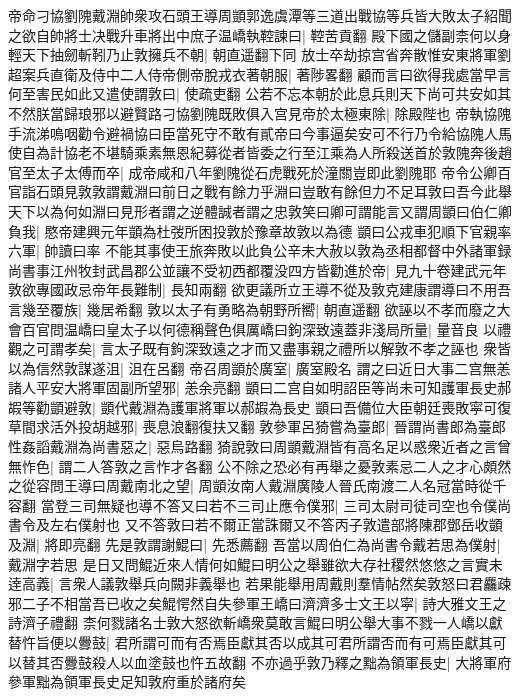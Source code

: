 帝命刁協劉隗戴淵帥衆攻石頭王導周顗郭逸虞潭等三道出戰協等兵皆大敗太子紹聞之欲自帥將士决戰升車將出中庶子温嶠執鞚諫曰|{
	鞚苦貢翻}
殿下國之儲副柰何以身輕天下抽劒斬靷乃止敦擁兵不朝|{
	朝直遥翻下同}
放士卒劫掠宫省奔散惟安東將軍劉超案兵直衛及侍中二人侍帝側帝脫戎衣著朝服|{
	著陟畧翻}
顧而言曰欲得我處當早言何至害民如此又遣使謂敦曰|{
	使疏吏翻}
公若不忘本朝於此息兵則天下尚可共安如其不然朕當歸琅邪以避賢路刁協劉隗既敗俱入宫見帝於太極東除|{
	除殿陛也}
帝執協隗手流涕嗚咽勸令避禍協曰臣當死守不敢有貳帝曰今事逼矣安可不行乃令給協隗人馬使自為計協老不堪騎乘素無恩紀募從者皆委之行至江乘為人所殺送首於敦隗奔後趙官至太子太傅而卒|{
	成帝咸和八年劉隗從石虎戰死於潼關豈即此劉隗耶}
帝令公卿百官詣石頭見敦敦謂戴淵曰前日之戰有餘力乎淵曰豈敢有餘但力不足耳敦曰吾今此舉天下以為何如淵曰見形者謂之逆體誠者謂之忠敦笑曰卿可謂能言又謂周顗曰伯仁卿負我|{
	愍帝建興元年顗為杜弢所困投敦於豫章故敦以為德}
顗曰公戎車犯順下官親率六軍|{
	帥讀曰率}
不能其事使王旅奔敗以此負公辛未大赦以敦為丞相都督中外諸軍録尚書事江州牧封武昌郡公並讓不受初西都覆没四方皆勸進於帝|{
	見九十卷建武元年}
敦欲專國政忌帝年長難制|{
	長知兩翻}
欲更議所立王導不從及敦克建康謂導曰不用吾言幾至覆族|{
	幾居希翻}
敦以太子有勇略為朝野所嚮|{
	朝直遥翻}
欲誣以不孝而廢之大會百官問温嶠曰皇太子以何德稱聲色俱厲嶠曰鉤深致遠蓋非淺局所量|{
	量音良}
以禮觀之可謂孝矣|{
	言太子既有鉤深致遠之才而又盡事親之禮所以解敦不孝之誣也}
衆皆以為信然敦謀遂沮|{
	沮在呂翻}
帝召周顗於廣室|{
	廣室殿名}
謂之曰近日大事二宫無恙諸人平安大將軍固副所望邪|{
	恙余亮翻}
顗曰二宫自如明詔臣等尚未可知護軍長史郝嘏等勸顗避敦|{
	顗代戴淵為護軍將軍以郝嘏為長史}
顗曰吾備位大臣朝廷喪敗寜可復草間求活外投胡越邪|{
	喪息浪翻復扶又翻}
敦參軍呂猗嘗為臺郎|{
	晉謂尚書郎為臺郎}
性姦謟戴淵為尚書惡之|{
	惡烏路翻}
猗說敦曰周顗戴淵皆有高名足以惑衆近者之言曾無怍色|{
	謂二人答敦之言怍才各翻}
公不除之恐必有再舉之憂敦素忌二人之才心頗然之從容問王導曰周戴南北之望|{
	周顗汝南人戴淵廣陵人晉氏南渡二人名冠當時從千容翻}
當登三司無疑也導不答又曰若不三司止應令僕邪|{
	三司太尉司徒司空也令僕尚書令及左右僕射也}
又不答敦曰若不爾正當誅爾又不答丙子敦遣部將陳郡鄧岳收顗及淵|{
	將即亮翻}
先是敦謂謝鯤曰|{
	先悉薦翻}
吾當以周伯仁為尚書令戴若思為僕射|{
	戴淵字若思}
是日又問鯤近來人情何如鯤曰明公之舉雖欲大存社稷然悠悠之言實未逹高義|{
	言衆人議敦舉兵向闕非義舉也}
若果能舉用周戴則羣情帖然矣敦怒曰君麤疎邪二子不相當吾已收之矣鯤愕然自失參軍王嶠曰濟濟多士文王以寜|{
	詩大雅文王之詩濟子禮翻}
柰何戮諸名士敦大怒欲斬嶠衆莫敢言鯤曰明公舉大事不戮一人嶠以獻替忤旨便以釁鼓|{
	君所謂可而有否焉臣獻其否以成其可君所謂否而有可焉臣獻其可以替其否釁鼓殺人以血塗鼓也忤五故翻}
不亦過乎敦乃釋之黜為領軍長史|{
	大將軍府參軍黜為領軍長史足知敦府重於諸府矣}
